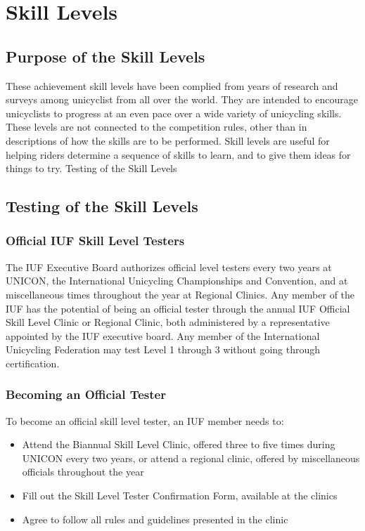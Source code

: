 \chapter{Skill Levels}
\section{Purpose of the Skill Levels}
These achievement skill levels have been complied from years of research and surveys among unicyclist from all over the
world. They are intended to encourage unicyclists to progress at an even pace over a wide variety of unicycling skills.
These levels are not connected to the competition rules, other than in descriptions of how the skills are to be performed.
Skill levels are useful for helping riders determine a sequence of skills to learn, and to give them ideas for things to try.
Testing of the Skill Levels

\section{Testing of the Skill Levels}
\subsection{ Official IUF Skill Level Testers}
The IUF Executive Board authorizes official level testers every two years at UNICON, the International Unicycling
Championships and Convention, and at miscellaneous times throughout the year at Regional Clinics. Any member of
the IUF has the potential of being an official tester through the annual IUF Official Skill Level Clinic or Regional
Clinic, both administered by a representative appointed by the IUF executive board. Any member of the International
Unicycling Federation may test Level 1 through 3 without going through certification.

\subsection{ Becoming an Official Tester}
To become an official skill level tester, an IUF member needs to:\\
\begin{itemize}
\item Attend the Biannual Skill Level Clinic, offered three to five times during UNICON every two years, or attend a
regional clinic, offered by miscellaneous officials throughout the year
\item Fill out the Skill Level Tester Confirmation Form, available at the clinics
\item Agree to follow all rules and guidelines presented in the clinic
\end{itemize}


